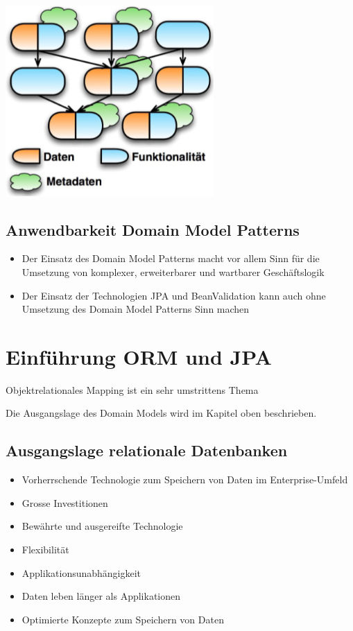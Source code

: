 \documentclass{report}
\newenvironment{Figure}
	{\par\medskip\noindent\minipage{\linewidth}}
	{\endminipage\par\medskip}
\theoremstyle{definition}
\theoremstyle{example}
\begin{document}
\begin{Figure}
\centering
\includegraphics[width=300px]{img/JPAMetadaten.png}
	\label{fig:Konzept von Klassen und Metadaten in JPA}
\end{Figure}

\subsection{Anwendbarkeit Domain Model Patterns}
\begin{itemize}
	\item Der Einsatz des Domain Model Patterns macht vor allem Sinn für die Umsetzung von komplexer, erweiterbarer und wartbarer Geschäftslogik
	\item Der Einsatz der Technologien JPA und BeanValidation kann auch ohne Umsetzung des Domain Model Patterns Sinn machen
\end{itemize}

\section{Einführung ORM und JPA}
Objektrelationales Mapping ist ein sehr umstrittens Thema

Die Ausgangslage des Domain Models wird im Kapitel oben beschrieben.


\subsection{Ausgangslage relationale Datenbanken}
\begin{itemize}
	\item Vorherrschende Technologie zum Speichern von Daten im Enterprise-Umfeld
	\item Grosse Investitionen
	\item Bewährte und ausgereifte Technologie
	\item Flexibilität
	\item Applikationsunabhängigkeit
	\item Daten leben länger als Applikationen
	\item Optimierte Konzepte zum Speichern von Daten
\end{itemize}
\end{document}
